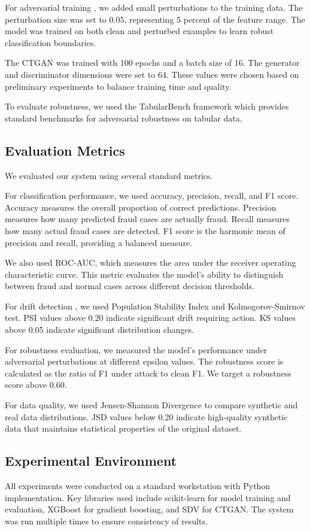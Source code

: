 For adversarial training \cite{madry2018adversarial}, we added small perturbations to the training data. The perturbation size was set to 0.05, representing 5 percent of the feature range. The model was trained on both clean and perturbed examples to learn robust classification boundaries.

The CTGAN \cite{xu2019ctgan} was trained with 100 epochs and a batch size of 16. The generator and discriminator dimensions were set to 64. These values were chosen based on preliminary experiments to balance training time and quality.

To evaluate robustness, we used the TabularBench framework \cite{simonetto2024tabularbench} which provides standard benchmarks for adversarial robustness on tabular data.

\subsection{Evaluation Metrics}

We evaluated our system using several standard metrics.

For classification performance, we used accuracy, precision, recall, and F1 score. Accuracy measures the overall proportion of correct predictions. Precision measures how many predicted fraud cases are actually fraud. Recall measures how many actual fraud cases are detected. F1 score is the harmonic mean of precision and recall, providing a balanced measure.

We also used ROC-AUC, which measures the area under the receiver operating characteristic curve. This metric evaluates the model's ability to distinguish between fraud and normal cases across different decision thresholds.

For drift detection \cite{goudar2026adaptive}, we used Population Stability Index and Kolmogorov-Smirnov test. PSI values above 0.20 indicate significant drift requiring action. KS values above 0.05 indicate significant distribution changes.

For robustness evaluation, we measured the model's performance under adversarial perturbations at different epsilon values. The robustness score is calculated as the ratio of F1 under attack to clean F1. We target a robustness score above 0.60.

For data quality, we used Jensen-Shannon Divergence to compare synthetic and real data distributions. JSD values below 0.20 indicate high-quality synthetic data that maintains statistical properties of the original dataset.

\subsection{Experimental Environment}

All experiments were conducted on a standard workstation with Python implementation. Key libraries used include scikit-learn for model training and evaluation, XGBoost for gradient boosting, and SDV for CTGAN. The system was run multiple times to ensure consistency of results.